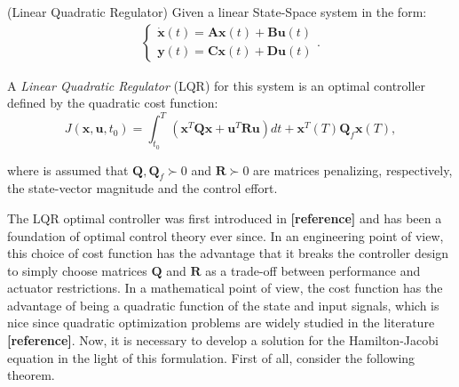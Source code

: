 \documentclass[a4paper,11pt]{book}
\numberwithin{figure}{chapter}
\numberwithin{equation}{chapter}
\numberwithin{table}{chapter}
\theoremstyle{definition}
\newtheorem{definition}{Definition}[chapter]
\newcounter{boxed-theorem}
\newcounter{boxed-definition}
\newenvironment{boxed-definition}[1]
{\colorlet{shadecolor}{pastelYellow!15} \begin{shaded} \begin{definition}{#1}}
{\end{definition} \end{shaded}}
\newcounter{boxed-example}
\begin{document}
\begin{boxed-definition}{(Linear Quadratic Regulator)} \label{def:lqr}
    Given a linear State-Space system in the form:
    \begin{align}
    \begin{cases}
        \dot{\bm{x}}(t) = \bm{A} \bm{x}(t) + \bm{B} \bm{u}(t) \\
        \bm{y}(t) = \bm{C} \bm{x}(t) + \bm{D} \bm{u}(t)
    \end{cases}
    .\end{align}
    
    A \textit{Linear Quadratic Regulator} (LQR) for this system is an optimal controller defined by the quadratic cost function:
    \begin{equation}
        J(\bm{x}, \bm{u}, t_0) = \int_{t_0}^{T} \left( \bm{x}^T \bm{Q} \bm{x} + \bm{u}^T \bm{R} \bm{u} \right) dt + \bm{x}^T(T) \bm{Q}_f \bm{x}(T)
    ,\end{equation}
    
    \noindent where is assumed that $\bm{Q},\bm{Q}_f  \succ 0$ and $\bm{R} \succ 0$ are matrices penalizing, respectively, the state-vector magnitude and the control effort.
\end{boxed-definition}

The LQR optimal controller was first introduced in \textbf{[reference]} and has been a foundation of optimal control theory ever since. In an engineering point of view, this choice of cost function has the advantage that it breaks the controller design to simply choose matrices $\bm{Q}$ and $\bm{R}$ as a trade-off between performance and actuator restrictions. In a mathematical point of view, the cost function has the advantage of being a quadratic function of the state and input signals, which is nice since quadratic optimization problems are widely studied in the literature \textbf{[reference]}. Now, it is necessary to develop a solution for the Hamilton-Jacobi equation in the light of this formulation. First of all, consider the following theorem.
\end{document}
